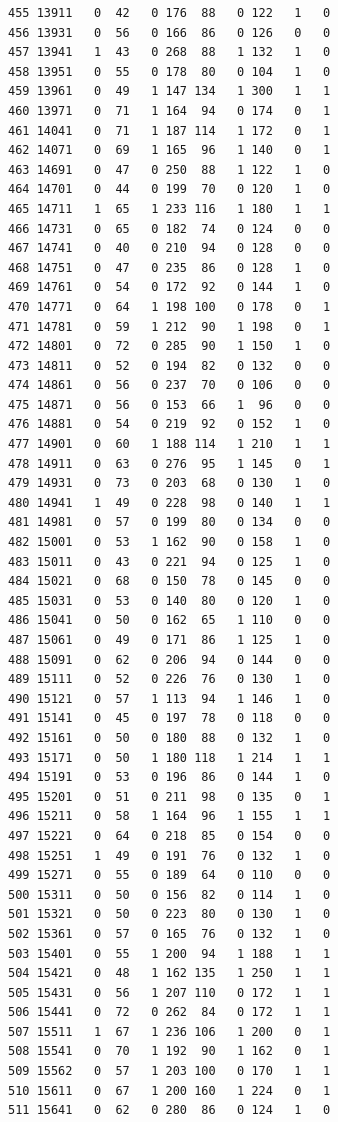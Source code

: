 \documentclass[
  letterpaper,
]{scrbook}
\begin{document}
\begin{verbatim}
455 13911   0  42   0 176  88   0 122   1   0
456 13931   0  56   0 166  86   0 126   0   0
457 13941   1  43   0 268  88   1 132   1   0
458 13951   0  55   0 178  80   0 104   1   0
459 13961   0  49   1 147 134   1 300   1   1
460 13971   0  71   1 164  94   0 174   0   1
461 14041   0  71   1 187 114   1 172   0   1
462 14071   0  69   1 165  96   1 140   0   1
463 14691   0  47   0 250  88   1 122   1   0
464 14701   0  44   0 199  70   0 120   1   0
465 14711   1  65   1 233 116   1 180   1   1
466 14731   0  65   0 182  74   0 124   0   0
467 14741   0  40   0 210  94   0 128   0   0
468 14751   0  47   0 235  86   0 128   1   0
469 14761   0  54   0 172  92   0 144   1   0
470 14771   0  64   1 198 100   0 178   0   1
471 14781   0  59   1 212  90   1 198   0   1
472 14801   0  72   0 285  90   1 150   1   0
473 14811   0  52   0 194  82   0 132   0   0
474 14861   0  56   0 237  70   0 106   0   0
475 14871   0  56   0 153  66   1  96   0   0
476 14881   0  54   0 219  92   0 152   1   0
477 14901   0  60   1 188 114   1 210   1   1
478 14911   0  63   0 276  95   1 145   0   1
479 14931   0  73   0 203  68   0 130   1   0
480 14941   1  49   0 228  98   0 140   1   1
481 14981   0  57   0 199  80   0 134   0   0
482 15001   0  53   1 162  90   0 158   1   0
483 15011   0  43   0 221  94   0 125   1   0
484 15021   0  68   0 150  78   0 145   0   0
485 15031   0  53   0 140  80   0 120   1   0
486 15041   0  50   0 162  65   1 110   0   0
487 15061   0  49   0 171  86   1 125   1   0
488 15091   0  62   0 206  94   0 144   0   0
489 15111   0  52   0 226  76   0 130   1   0
490 15121   0  57   1 113  94   1 146   1   0
491 15141   0  45   0 197  78   0 118   0   0
492 15161   0  50   0 180  88   0 132   1   0
493 15171   0  50   1 180 118   1 214   1   1
494 15191   0  53   0 196  86   0 144   1   0
495 15201   0  51   0 211  98   0 135   0   1
496 15211   0  58   1 164  96   1 155   1   1
497 15221   0  64   0 218  85   0 154   0   0
498 15251   1  49   0 191  76   0 132   1   0
499 15271   0  55   0 189  64   0 110   0   0
500 15311   0  50   0 156  82   0 114   1   0
501 15321   0  50   0 223  80   0 130   1   0
502 15361   0  57   0 165  76   0 132   1   0
503 15401   0  55   1 200  94   1 188   1   1
504 15421   0  48   1 162 135   1 250   1   1
505 15431   0  56   1 207 110   0 172   1   1
506 15441   0  72   0 262  84   0 172   1   1
507 15511   1  67   1 236 106   1 200   0   1
508 15541   0  70   1 192  90   1 162   0   1
509 15562   0  57   1 203 100   0 170   1   1
510 15611   0  67   1 200 160   1 224   0   1
511 15641   0  62   0 280  86   0 124   1   0

\end{verbatim}
\end{document}
